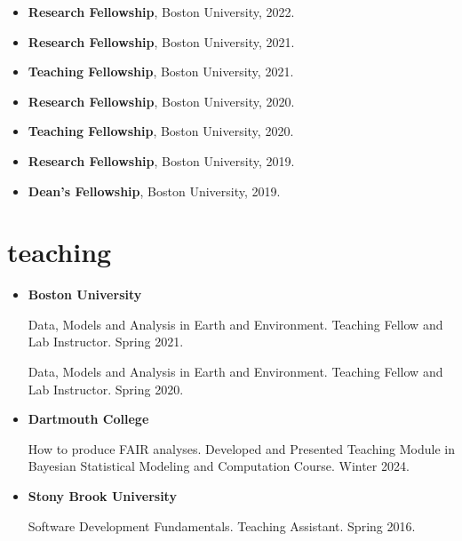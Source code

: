 \documentclass[10pt,oneside]{article}
\begin{document}
\begin{itemize}[label={}]
  
  \item \textbf{Research Fellowship}, Boston University, 2022.
        
  \item \textbf{Research Fellowship}, Boston University, 2021.
        
  \item \textbf{Teaching Fellowship}, Boston University, 2021.
        
  \item \textbf{Research Fellowship}, Boston University, 2020.
        
  \item \textbf{Teaching Fellowship}, Boston University, 2020.
        
  \item \textbf{Research Fellowship}, Boston University, 2019.
        
  \item \textbf{Dean's Fellowship}, Boston University, 2019.
        
\end{itemize}


\section{teaching}

\mbox{}\vspace{-\dimexpr\baselineskip\relax}


\begin{itemize}[label={}]
  
  \item \textbf{Boston University}
        
        Data, Models and Analysis in Earth and Environment. Teaching Fellow and Lab Instructor. Spring 2021.
        
        Data, Models and Analysis in Earth and Environment. Teaching Fellow and Lab Instructor. Spring 2020.
        
        
  \item \textbf{Dartmouth College}
        
        How to produce FAIR analyses. Developed and Presented Teaching Module in Bayesian Statistical Modeling and Computation Course. Winter 2024.
        
        
  \item \textbf{Stony Brook University}
        
        Software Development Fundamentals. Teaching Assistant. Spring 2016.
        
        
\end{itemize}
\end{document}
